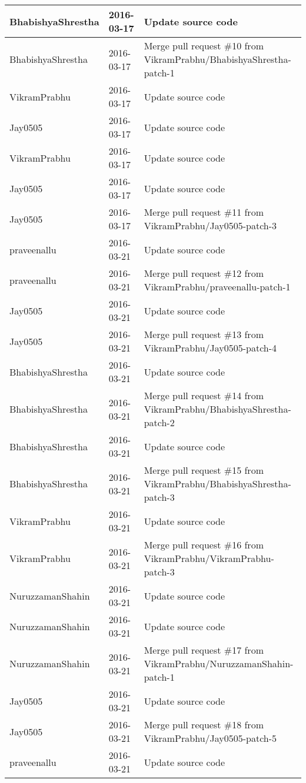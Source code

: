 \documentclass[a4paper]{article}
\begin{document}
\begin{center}
\begin{longtable}{|l|l|l|}
BhabishyaShrestha & 2016-03-17 & Update source code \\ \hline
BhabishyaShrestha & 2016-03-17 & Merge pull request \#10 from VikramPrabhu/BhabishyaShrestha-patch-1 \\ \hline
VikramPrabhu & 2016-03-17 & Update source code \\ \hline
Jay0505 & 2016-03-17 & Update source code \\ \hline
VikramPrabhu & 2016-03-17 & Update source code \\ \hline
Jay0505 & 2016-03-17 & Update source code \\ \hline
Jay0505 & 2016-03-17 & Merge pull request \#11 from VikramPrabhu/Jay0505-patch-3 \\ \hline
praveenallu & 2016-03-21 & Update source code \\ \hline
praveenallu & 2016-03-21 & Merge pull request \#12 from VikramPrabhu/praveenallu-patch-1 \\ \hline
Jay0505 & 2016-03-21 & Update source code \\ \hline
Jay0505 & 2016-03-21 & Merge pull request \#13 from VikramPrabhu/Jay0505-patch-4 \\ \hline
BhabishyaShrestha & 2016-03-21 & Update source code \\ \hline
BhabishyaShrestha & 2016-03-21 & Merge pull request \#14 from VikramPrabhu/BhabishyaShrestha-patch-2 \\ \hline
BhabishyaShrestha & 2016-03-21 & Update source code \\ \hline
BhabishyaShrestha & 2016-03-21 & Merge pull request \#15 from VikramPrabhu/BhabishyaShrestha-patch-3 \\ \hline
VikramPrabhu & 2016-03-21 & Update source code \\ \hline
VikramPrabhu & 2016-03-21 & Merge pull request \#16 from VikramPrabhu/VikramPrabhu-patch-3 \\ \hline
NuruzzamanShahin & 2016-03-21 & Update source code \\ \hline
NuruzzamanShahin & 2016-03-21 & Update source code \\ \hline
NuruzzamanShahin & 2016-03-21 & Merge pull request \#17 from VikramPrabhu/NuruzzamanShahin-patch-1 \\ \hline
Jay0505 & 2016-03-21 & Update source code \\ \hline
Jay0505 & 2016-03-21 & Merge pull request \#18 from VikramPrabhu/Jay0505-patch-5 \\ \hline
praveenallu & 2016-03-21 & Update source code \\ \hline

\end{longtable}
\end{center}
\end{document}

